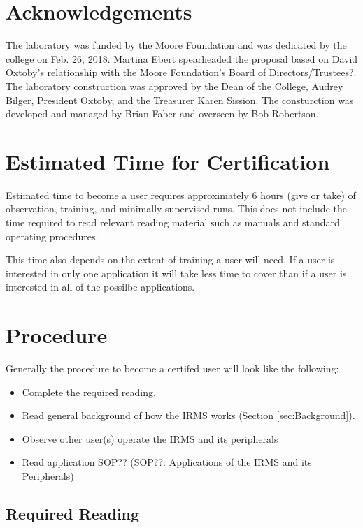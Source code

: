 \documentclass[12pt]{../SOP3}\usepackage[]{graphicx}\usepackage[]{color}
\begin{document}
\newpage
\section{Acknowledgements}

The laboratory was funded by the Moore Foundation and was dedicated by the college on Feb. 26, 2018. Martina Ebert spearheaded the proposal based on David Oxtoby's relationship with the Moore Foundation's Board of Directors/Trustees?. The laboratory construction was approved by the Dean of the College, Audrey Bilger, President Oxtoby, and the Treasurer Karen Sission. The consturction was developed and managed by Brian Faber and overseen by Bob Robertson.

\section{Estimated Time for Certification}

\NP Estimated time to become a user requires approximately 6 hours (give or take) of observation, training, and minimally supervised runs. This does not include the time required to read relevant reading material such as manuals and standard operating procedures.

\NP This time also depends on the extent of training a user will need. If a user is interested in only one application it will take less time to cover than if a user is interested in all of the possilbe applications.

\section{Procedure}

\NP Generally the procedure to become a certifed user will look like the following:

\begin{itemize}
  \item Complete the required reading.
  \item Read general background of how the IRMS works (\hyperref[sec:Background]{Section \ref*{sec:Background}}).
  \item Observe other user(s) operate the IRMS and its peripherals
  \item Read application SOP?? (SOP??: Applications of the IRMS and its Peripherals)
\end{itemize}

\subsection{Required Reading} \label{subsec:Required Reading}
\end{document}
